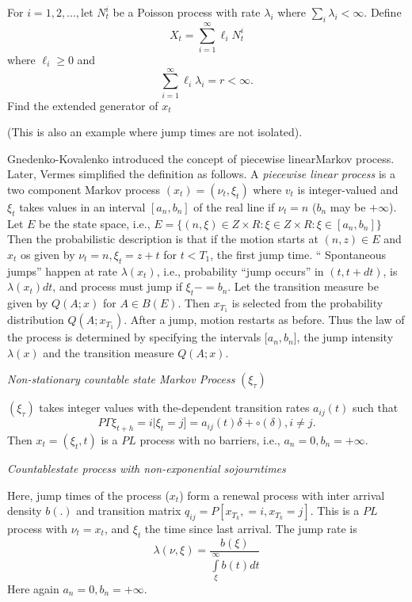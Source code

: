 \begin{exercise} %
  For $ i = 1,2,\ldots, $let $N^i_t$ be a Poisson process with rate
  $\lambda _i$ where $\sum_i \lambda_i < \infty$. Define  
  $$
  X_t = \sum_{i=1}^{\infty} \ell_i N^i_t 
  $$
  where $\ell_i \geq 0$ and 
  $$
  \sum^{\infty}_{i=1} \ell_i \lambda_i = r < \infty. 
  $$
  Find the extended generator of $x_t$ 

  (This is also an example where jump times are not isolated). 
\end{exercise}


\medskip
{}\pageoriginale

Gnedenko-Kovalenko introduced the concept of piecewise
linear\break Markov process. Later, Vermes \cite{key24} simplified the definition
as follows. A \textit{ piecewise linear process} is a two component
Markov process $(x_t)= (\nu_t, \xi_t)$ where $v_t$ is integer-valued
and $\xi_t$ takes values in an interval $[a_n, b_n]$ of the real line
if $\nu_t = n$ ($b_n$ may be $+ \infty$). Let $E$ be the state space,
i.e., $E= \{ (n, \xi )\in Z \times R: \xi \in Z \times R : \xi \in
[a_n, b_n]\}$ Then the probabilistic description is that if the motion
starts at $(n, z)\in E$ and $x_t$ os given by $\nu_t = n, \xi_t =
z + t$ for $t < T_1$, the first jump time. `` Spontaneous jumps''
happen at rate $\lambda(x_t)$, i.e., probability ``jump occurs'' in
$(t, t + dt)$, is $\lambda (x_t)dt$,  and process must jump if $
\xi_t-=b_n$. Let the transition measure be given by 
$Q(A; x)$ for $A \in B(E)$. Then $x_{T_1}$ is selected from the
probability distribution $Q(A ; x_{T_1})$. After a jump, motion
restarts as before. Thus the law of the process is determined by
specifying the intervals [$ a_n, b_n$], the jump intensity $\lambda
(x)$ and the transition measure $Q(A; x)$.  

\begin{example} %
  \textit{Non-stationary countable state Markov Process} $(\xi_\tau)$

  $(\xi_\tau)$ takes integer values with the-dependent transition
  rates $a_{ij}(t)$ such that  
  $$
  P\Gamma \xi_{t + h}= i | \xi_t = j ] = a_{ij}(t) \delta +\circ
    (\delta), i \neq j.  
  $$
    Then $x_t =( \xi_t, t)$ is a $PL$ process with no barriers, i.e.,
    $a_n = 0, b_n = + \infty$.  
\end{example}

\begin{example} %
  \textit{Countable\pageoriginale state process with non-exponential
    sojourn\break times}  
	
  Here, jump times of the process ($x_t$) form a renewal process with
  inter arrival density $b(.)$ and transition matrix $q_{ij}=
  P[x_{T_k}, = i, x_{T_k} = j]$. This is a $PL$ process with $\nu_t =
  x_t$, and $\xi _t$ the time since last arrival. The jump rate is 
  $$
  \lambda (\nu, \xi )= \frac{b (\xi)}{\int\limits_{\xi}^{\infty}b(t) dt}
  $$ 
  Here again $a_n = 0, b_n = + \infty$. 
\end{example}

